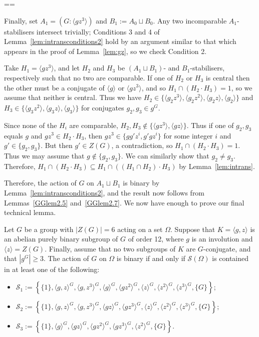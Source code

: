 \documentclass[11pt, a4paper]{amsart}
\makeatletter
\renewcommand{\proofname}{Proof}
\renewenvironment{proof}[1][\proofname]{\par
  \pushQED{\qed}  \normalfont \partopsep=\z@skip \topsep=\z@skip
  \trivlist
  \item[\hskip\labelsep
        \scshape
    #1\@addpunct{.}]\ignorespaces
}{  \popQED\endtrivlist\@endpefalse
}
\makeatother
\begin{document}
\begin{proof}
    Finally, set $A_1=(G:\langle gz^3\rangle)$ and $B_1:=A_0\sqcup B_0$. Any two incomparable $A_1$-stabilisers intersect trivially; Conditions 3 and 4 of Lemma~\ref{lem:intransconditions2} hold by an argument similar to that which appears in the proof of Lemma~\ref{lem:gz}, so we check Condition 2.

    Take $H_1=\langle gz^3\rangle$, and let $H_2$ and $H_3$ be $(A_1\sqcup B_1)$- and $B_1$-stabilisers, respectively such that no two are comparable. If one of $H_2$ or $H_3$ is central then the other must be a conjugate of $\langle g\rangle$ or $\langle gz^3\rangle$, and so $H_1\cap (H_2\cdot H_3)=1$, so we assume that neither is central. Thus we have $H_2\in\{\langle g_2z^3\rangle,\langle g_2z^2\rangle,\langle g_2z\rangle,\langle g_2\rangle\}$ and $H_3\in\{\langle g_3z^2\rangle,\langle g_3z\rangle,\langle g_3\rangle\}$ for conjugates $g_2,g_3\in g^G$.
    
    Since none of the $H_i$ are comparable, $H_2,H_3\not\in\{\langle gz^3\rangle,\langle gz\rangle\}$. Thus if one of $g_2,g_3$ equals $g$ and $gz^3\in H_2\cdot H_3$, then $gz^3\in\{gg'z^{i},g'gz^i\}$ for some integer $i$ and $g'\in \{g_2,g_3\}$. But then $g'\in Z(G)$, a contradiction, so $H_1\cap(H_2\cdot H_3)=1$. Thus we may assume that $g\not\in\{g_2,g_3\}$. We can similarly show that $g_2\ne g_3$. Therefore, $H_1\cap(H_2\cdot H_3)\subseteq H_1\cap((H_1\cap H_2)\cdot H_3)$ by Lemma~\ref{lem:intrans}. 
    
    Therefore, the action of $G$ on $A_1\sqcup B_1$ is binary by Lemma~\ref{lem:intransconditions2}, and the result now follows from Lemmas~\ref{GGlem2.5} and~\ref{GGlem2.7}.
\end{proof}
We now have enough to prove our final technical lemma.
\begin{lemma}\label{lem:cent6class}
Let $G$ be a group with $|Z(G)|=6$ acting on a set $\Omega$. Suppose that $K=\langle g,z\rangle$ is an abelian purely binary subgroup of $G$ of order 12, where $g$ is an involution and $\langle z\rangle=Z(G)$. Finally, assume that no two subgroups of $K$ are $G$-conjugate, and that $|g^G|\geq 3$. The action of $G$ on $\Omega$ is binary if and only if $\mathcal{S}(\Omega)$ is contained in at least one of the following:\begin{itemize}
    \item $\mathcal{S}_1:=\left\{\{1\},\langle g,z\rangle^G,\langle g,z^3\rangle^G,\langle g\rangle^G,\langle gz^2\rangle^G,\langle z\rangle^G,\langle z^2\rangle^G,\langle z^3\rangle^G,\{G\}\right\}$;
    
    \item $\mathcal{S}_2:=\left\{\{1\},\langle g,z\rangle^G,\langle g,z^3\rangle^G,\langle gz\rangle^G,\langle gz^3\rangle^G,\langle z\rangle^G,\langle z^2\rangle^G,\langle z^3\rangle^G,\{G\}\right\};
$

    \item $\mathcal{S}_3:=\left\{\{1\},\langle g\rangle^G,\langle gz\rangle^G,\langle gz^2\rangle^G,\langle gz^3\rangle^G,\langle z^2\rangle^G,\{G\}\right\}$.
\end{itemize}
\end{lemma}
\end{document}
